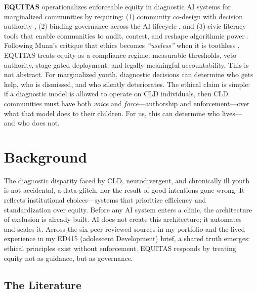 \documentclass[12pt,a4paper]{article}
\begin{document}
\vspace{0.5em}
\textbf{EQUITAS} operationalizes enforceable equity in diagnostic AI systems for marginalized communities by requiring: (1) community co-design with decision authority \citep{Nadarzynski2024}, (2) binding governance across the AI lifecycle \citep{Lekadir2025}, and (3) civic literacy tools that enable communities to audit, contest, and reshape algorithmic power \citep{SocialJusticeStandards2018, Wiegand2020}. Following Munn’s critique that ethics becomes \textit{``useless''} when it is toothless \citep{Munn2023}, EQUITAS treats equity as a compliance regime: measurable thresholds, veto authority, stage-gated deployment, and legally meaningful accountability. This is not abstract. For marginalized youth, diagnostic decisions can determine who gets help, who is dismissed, and who silently deteriorates. The ethical claim is simple: if a diagnostic model is allowed to operate on CLD individuals, then CLD communities must have both \emph{voice} and \emph{force}—authorship and enforcement—over what that model does to their children. For us, this can determine who lives—and who does not.





\newpage
\section{Background}

The diagnostic disparity faced by CLD, neurodivergent, and chronically ill youth is not accidental, a data glitch, nor the result of good intentions gone wrong. It reflects institutional choices—systems that prioritize efficiency and standardization over equity. Before any AI system enters a clinic, the architecture of exclusion is already built. AI does not create this architecture; it automates and scales it. Across the six peer-reviewed sources in my portfolio and the lived experience in my ED415 (adolescent Development) brief, a shared truth emerges: ethical principles exist without enforcement. EQUITAS responds by treating equity not as guidance, but as governance.

\subsection{The Literature}
\end{document}
